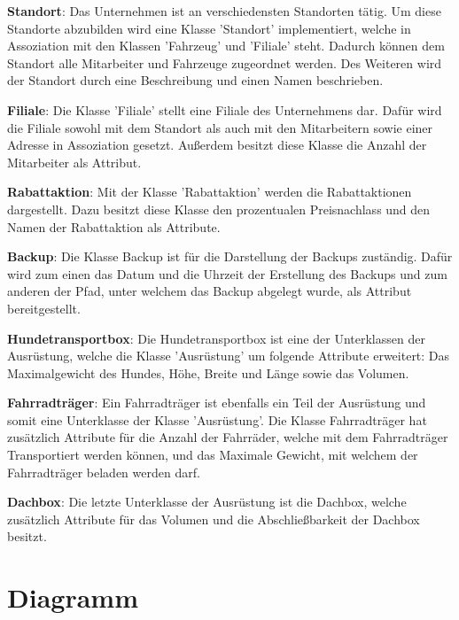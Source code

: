 \textbf{Standort}: Das Unternehmen ist an verschiedensten Standorten tätig. Um diese Standorte abzubilden wird eine Klasse 'Standort' implementiert, welche in Assoziation mit den Klassen 'Fahrzeug' und 'Filiale' steht. Dadurch können dem Standort alle Mitarbeiter und Fahrzeuge zugeordnet werden.
Des Weiteren wird der Standort durch eine Beschreibung und einen Namen beschrieben.

\textbf{Filiale}: Die Klasse 'Filiale' stellt eine Filiale des Unternehmens dar. Dafür wird die Filiale sowohl mit dem Standort als auch mit den Mitarbeitern sowie einer Adresse in Assoziation gesetzt. Außerdem besitzt diese Klasse die Anzahl der Mitarbeiter als Attribut.  

\textbf{Rabattaktion}: Mit der Klasse 'Rabattaktion' werden die Rabattaktionen dargestellt. Dazu besitzt diese Klasse den prozentualen Preisnachlass und den Namen der Rabattaktion als Attribute.

\textbf{Backup}: Die Klasse Backup ist für die Darstellung der Backups zuständig. Dafür wird zum einen das Datum und die Uhrzeit der Erstellung des Backups und zum anderen der Pfad, unter welchem das Backup abgelegt wurde, als Attribut bereitgestellt.

\textbf{Hundetransportbox}: Die Hundetransportbox ist eine der Unterklassen der Ausrüstung, welche die Klasse 'Ausrüstung' um folgende Attribute erweitert: Das Maximalgewicht des Hundes, Höhe, Breite und Länge sowie das Volumen.

\textbf{Fahrradträger}: Ein Fahrradträger ist ebenfalls ein Teil der Ausrüstung und somit eine Unterklasse der Klasse 'Ausrüstung'. Die Klasse Fahrradträger hat zusätzlich Attribute für die Anzahl der Fahrräder, welche mit dem Fahrradträger Transportiert werden können, und das Maximale Gewicht, mit welchem der Fahrradträger beladen werden darf.

\textbf{Dachbox}: Die letzte Unterklasse der Ausrüstung ist die Dachbox, welche zusätzlich Attribute für das Volumen und die Abschließbarkeit der Dachbox besitzt.


\newpage


\section{Diagramm}

